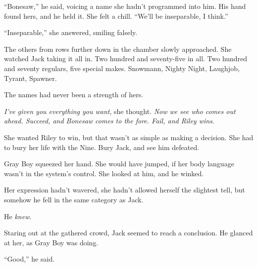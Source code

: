 ``Bonesaw,'' he said, voicing a name she hadn't programmed into him.  His hand found hers, and he held it.  She felt a chill.  ``We'll be inseparable, I think.''



``Inseparable,'' she answered, smiling falsely.



The others from rows further down in the chamber slowly approached.  She watched Jack taking it all in.  Two hundred and seventy-five in all.  Two hundred and seventy regulars, five special makes.  Snowmann, Nighty Night, Laughjob, Tyrant, Spawner.



The names had never been a strength of hers.



\emph{I've given you everything you want}, she thought.  \emph{Now we see who comes out ahead.  Succeed, and Bonesaw comes to the fore.  Fail, and Riley wins}.



She wanted Riley to win, but that wasn't as simple as making a decision.  She had to bury her life with the Nine.  Bury Jack, and see him defeated.



Gray Boy squeezed her hand.  She would have jumped, if her body language wasn't in the system's control.  She looked at him, and he winked.



Her expression hadn't wavered, she hadn't allowed herself the slightest tell, but somehow he fell in the same category as Jack.



He \emph{knew}.



Staring out at the gathered crowd, Jack seemed to reach a conclusion.  He glanced at her, as Gray Boy was doing.



``Good,'' he said.





